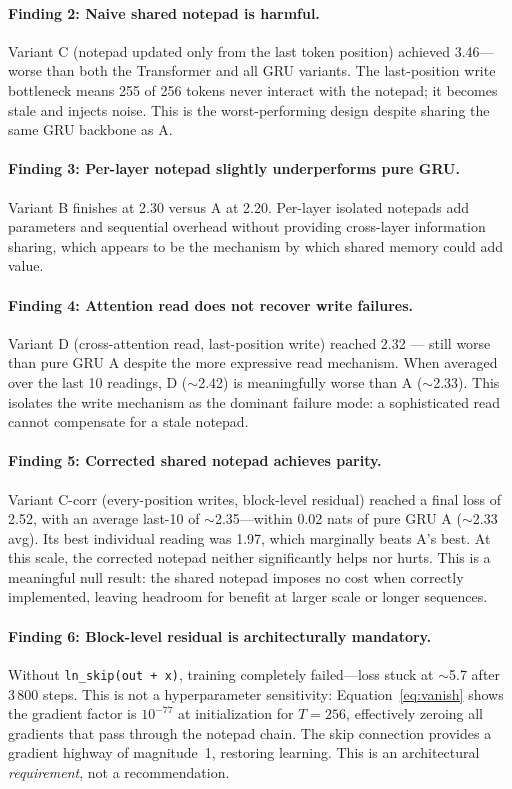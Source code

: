 \documentclass[11pt,a4paper]{article}
\begin{document}
\paragraph{Finding 2: Naive shared notepad is harmful.}
Variant C (notepad updated only from the last token position) achieved
3.46---worse than both the Transformer and all GRU variants.  The last-position
write bottleneck means 255 of 256 tokens never interact with the notepad; it
becomes stale and injects noise.  This is the worst-performing design despite
sharing the same GRU backbone as A.

\paragraph{Finding 3: Per-layer notepad slightly underperforms pure GRU.}
Variant B finishes at 2.30 versus A at 2.20.  Per-layer isolated notepads
add parameters and sequential overhead without providing cross-layer
information sharing, which appears to be the mechanism by which shared
memory could add value.

\paragraph{Finding 4: Attention read does not recover write failures.}
Variant D (cross-attention read, last-position write) reached 2.32 --- still
worse than pure GRU A despite the more expressive read mechanism.  When
averaged over the last 10 readings, D ($\sim$2.42) is meaningfully worse
than A ($\sim$2.33).  This isolates the write mechanism as the dominant
failure mode: a sophisticated read cannot compensate for a stale notepad.

\paragraph{Finding 5: Corrected shared notepad achieves parity.}
Variant C-corr (every-position writes, block-level residual) reached a final
loss of 2.52, with an average last-10 of $\sim$2.35---within 0.02 nats of
pure GRU A ($\sim$2.33 avg).  Its best individual reading was 1.97, which
marginally beats A's best.  At this scale, the corrected notepad neither
significantly helps nor hurts.  This is a meaningful null result: the
shared notepad imposes no cost when correctly implemented, leaving headroom
for benefit at larger scale or longer sequences.

\paragraph{Finding 6: Block-level residual is architecturally mandatory.}
Without \texttt{ln\_skip(out + x)}, training completely failed---loss stuck
at $\sim$5.7 after 3\,800 steps.  This is not a hyperparameter sensitivity:
Equation~\ref{eq:vanish} shows the gradient factor is $10^{-77}$ at
initialization for $T{=}256$, effectively zeroing all gradients that pass
through the notepad chain.  The skip connection provides a gradient highway
of magnitude~1, restoring learning.  This is an architectural
\emph{requirement}, not a recommendation.
\end{document}
